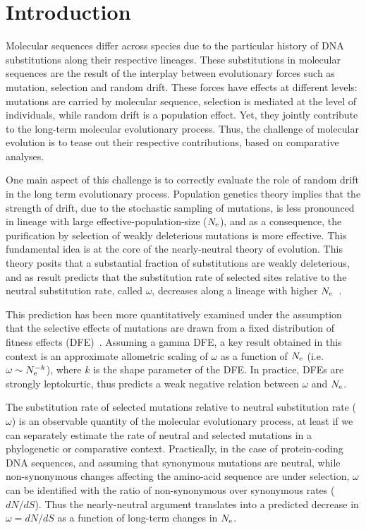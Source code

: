 \section{Introduction}
Molecular sequences differ across species due to the particular history of \acrshort{DNA} \glspl{substitution} along their respective lineages.
These \glspl{substitution} in molecular sequences are the result of the interplay between evolutionary forces such as mutation, selection and random \gls{drift}.
These forces have effects at different levels: mutations are carried by molecular sequence, selection is mediated at the level of individuals, while random \gls{drift} is a population effect.
Yet, they jointly contribute to the long-term molecular evolutionary process.
Thus, the challenge of molecular evolution is to tease out their respective contributions, based on comparative analyses.

One main aspect of this challenge is to correctly evaluate the role of random drift in the long term evolutionary process.
Population genetics theory implies that the strength of drift, due to the stochastic sampling of mutations, is less pronounced in lineage with large \gls{effective-population-size} ($N_{\mathrm{e}}$), and as a consequence, the purification by selection of weakly deleterious mutations is more effective.
This fundamental idea is at the core of the \gls{nearly-neutral} theory of evolution.
This theory posits that a substantial fraction of \glspl{substitution} are weakly deleterious, and as result predicts that the \gls{substitution} rate of selected sites relative to the \gls{neutral} \gls{substitution} rate, called $\omega$, decreases along a lineage with higher $N_{\mathrm{e}}$~\citep{Ohta1972, Ohta1992}.

This prediction has been more quantitatively examined under the assumption that the selective effects of mutations are drawn from a fixed distribution of fitness effects (\acrshort{DFE})~\citep{Kimura1979, Welch2008}.
Assuming a gamma \acrshort{DFE}, a key result obtained in this context is an approximate allometric scaling of $\omega$ as a function of $N_{\mathrm{e}}$ (i.e. $\omega \sim N_{\mathrm{e}}^{-k}$), where $k$ is the shape parameter of the \acrshort{DFE}.
In practice, DFEs are strongly leptokurtic, thus predicts a weak negative relation between $\omega$ and $N_{\mathrm{e}}$.

The \gls{substitution} rate of selected mutations relative to \gls{neutral} \gls{substitution} rate ($\omega$) is an observable quantity of the molecular evolutionary process, at least if we can separately estimate the rate of \gls{neutral} and selected mutations in a phylogenetic or comparative context.
Practically, in the case of protein-coding \acrshort{DNA} sequences, and assuming that synonymous mutations are \gls{neutral}, while non-synonymous changes affecting the amino-acid sequence are under selection, $\omega$ can be identified with the ratio of non-synonymous over \gls{synonymous} rates ($dN/dS$).
Thus the \gls{nearly-neutral} argument translates into a predicted decrease in $\omega = dN/dS$ as a function of long-term changes in $N_{\mathrm{e}}$.

